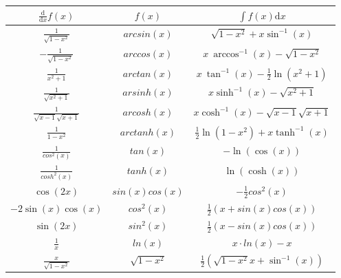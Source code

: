 \documentclass[paper=a3,paper=landscape, fontsize=9pt, DIV=30]{scrartcl}
\begin{document}
\begin{multicols*}{4}
		\bgroup
		\def\arraystretch{4}
        \begin{tabular}{|c|c|c|}
          \hline
           $\frac{\mathrm d}{\mathrm d x}  f(x)$  & $f(x)$           & $\int f(x) \mathrm{d}x$   \\ \hline
           $\frac{1}{\sqrt{1-x^2}}$                             & $arcsin(x)$      & $\sqrt{1-x^2}+x \sin^{-1}(x)$             \\ %
           $-\frac{1}{\sqrt{1-x^2}}$                            & $arccos(x)$      & $x \ \arccos^{-1}(x)-\sqrt{1-x^2}$        \\ %
           $\frac{1}{x^2+1}$                                    & $arctan(x)$      & $x \ \tan^{-1}(x)-\frac{1}{2}\ln(x^2+1)$  \\ %
           $\frac{1}{\sqrt{x^2+1}}$                             & $arsinh(x)$      & $x \sinh^{-1}(x)-\sqrt{x^2+1}$            \\ %
           $\frac{1}{\sqrt{x-1}\sqrt{x+1}}$                     & $arcosh(x)$      & $x \cosh^{-1}(x)-\sqrt{x-1}\sqrt{x+1}$    \\ %
           $\frac{1}{1-x^2}$                                    & $arctanh(x)$      & $\frac{1}{2} \ln(1-x^2)+x \tanh^{-1}(x)$ \\ %
           $\frac{1}{cos^2(x)}$                                 & $tan(x)$         & $-\ln(\cos(x))$                           \\ %
           $\frac{1}{cosh^2(x)}$                                & $tanh(x)$        & $\ln(\cosh(x))$                           \\ %
           $\cos(2x)$                                           & $sin(x)cos(x)$   & $-\frac{1}{2}cos^2(x)$                    \\ %
           $-2\sin(x)\cos(x)$                                   & $cos^2(x)$       & $\frac{1}{2}(x+sin(x)cos(x))$             \\ %
           $\sin(2x)$                                           & $sin^2(x)$       & $\frac{1}{2}(x-sin(x)cos(x))$             \\ %
           $\frac{1}{x}$                                        & $ln(x)$          & $x \cdot ln(x)-x$                         \\ %
           $\frac{x}{\sqrt{1-x^2}}$                             & $\sqrt{1-x^2}$   & $\frac{1}{2}(\sqrt{1-x^2}x+\sin^{-1}(x))$ \\
           \hline
        \end{tabular}
		\egroup
		

\end{multicols*}
\end{document}
